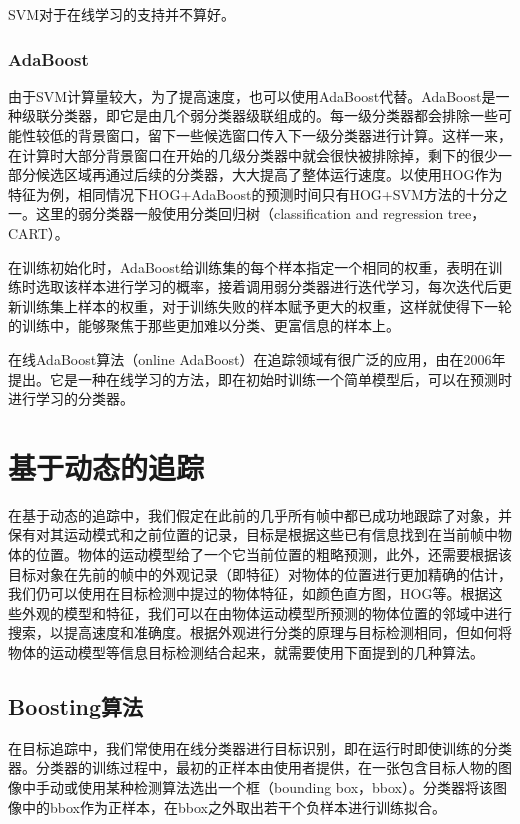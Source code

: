   SVM对于在线学习的支持并不算好。

\subsubsection{AdaBoost}

  由于SVM计算量较大，为了提高速度，也可以使用AdaBoost代替。AdaBoost是一种级联分类器，即它是由几个弱分类器级联组成的。每一级分类器都会排除一些可能性较低的背景窗口，留下一些候选窗口传入下一级分类器进行计算。这样一来，在计算时大部分背景窗口在开始的几级分类器中就会很快被排除掉，剩下的很少一部分候选区域再通过后续的分类器，大大提高了整体运行速度。以使用HOG作为特征为例，相同情况下HOG+AdaBoost的预测时间只有HOG+SVM方法的十分之一。这里的弱分类器一般使用分类回归树（classification and regression tree，CART）。

  在训练初始化时，AdaBoost给训练集的每个样本指定一个相同的权重，表明在训练时选取该样本进行学习的概率，接着调用弱分类器进行迭代学习，每次迭代后更新训练集上样本的权重，对于训练失败的样本赋予更大的权重，这样就使得下一轮的训练中，能够聚焦于那些更加难以分类、更富信息的样本上。

  在线AdaBoost算法（online AdaBoost）在追踪领域有很广泛的应用，由\citet{grabner2006real}在2006年提出。它是一种在线学习的方法，即在初始时训练一个简单模型后，可以在预测时进行学习的分类器。

\section{基于动态的追踪}

  在基于动态的追踪中，我们假定在此前的几乎所有帧中都已成功地跟踪了对象，并保有对其运动模式和之前位置的记录，目标是根据这些已有信息找到在当前帧中物体的位置。物体的运动模型给了一个它当前位置的粗略预测，此外，还需要根据该目标对象在先前的帧中的外观记录（即特征）对物体的位置进行更加精确的估计，我们仍可以使用在目标检测中提过的物体特征，如颜色直方图，HOG等。根据这些外观的模型和特征，我们可以在由物体运动模型所预测的物体位置的邻域中进行搜索，以提高速度和准确度。根据外观进行分类的原理与目标检测相同，但如何将物体的运动模型等信息目标检测结合起来，就需要使用下面提到的几种算法。

\subsection{Boosting算法}
  在目标追踪中，我们常使用在线分类器进行目标识别，即在运行时即使训练的分类器。分类器的训练过程中，最初的正样本由使用者提供，在一张包含目标人物的图像中手动或使用某种检测算法选出一个框（bounding box，bbox）。分类器将该图像中的bbox作为正样本，在bbox之外取出若干个负样本进行训练拟合。

